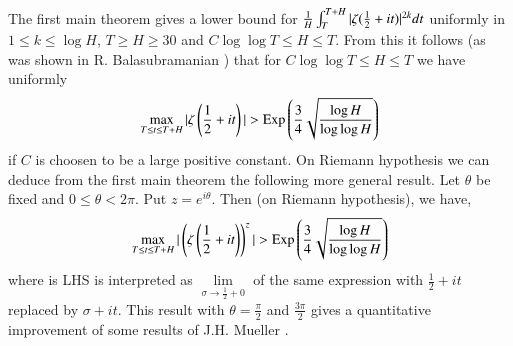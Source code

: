 \begin{remark}\label{c2:rem3}
The first main theorem gives a lower bound for $\frac{1}{H}
\int^{T+H}_T\break |\zeta (\frac{1}{2}+ it)|^{2k} dt $ uniformly in $1
\leq k \leq \log H$, $T \geq H \geq 30$  and $C \log \log T \leq H
\leq T$. From this it follows (as was shown in R. Balasubramanian
\cite{Balasubramanian1}) that for $C \log \log T \leq H \leq T$ we
have uniformly 
$$
\max\limits_{T \leq t \leq T + H} |\zeta \left(\frac{1}{2} +it \right)| > \operatorname{Exp} \left(\frac{3}{4} \sqrt{\frac{\log H}{\log \log H}} \right)
$$
if $C$ is choosen to be a large positive constant. On Riemann hypothesis we can deduce from the first main theorem the following more general result. Let $\theta$ be fixed and $0 \leq \theta < 2\pi$. Put $z = e^{i\theta}$. Then (on Riemann hypothesis), we have,
$$ 
\max\limits_{T \leq t \leq T + H} | \left(\zeta \left(\frac{1}{2} + it \right) \right)^z| > \operatorname{Exp} \left(\frac{3}{4} \sqrt{\frac{\log H}{\log \log H}} \right)
$$
where is LHS is interpreted as $\lim\limits_{\sigma \to \frac{1}{2} + 0}$ of the same expression with $\frac{1}{2} + it$ replaced by $\sigma + it$. This result with $\theta = \frac{\pi}{2}$ and $\frac{3\pi}{2}$ gives a quantitative improvement of some results of J.H. Mueller \cite{Mueller1}.
\end{remark}

